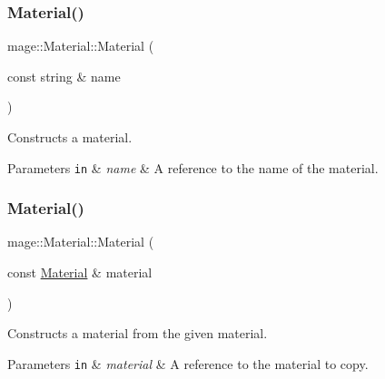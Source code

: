 \subsubsection{\texorpdfstring{Material()}{Material()}\hspace{0.1cm}{\footnotesize\ttfamily [1/3]}}
{\footnotesize\ttfamily mage\+::\+Material\+::\+Material (\begin{DoxyParamCaption}\item[{const string \&}]{name }\end{DoxyParamCaption})\hspace{0.3cm}{\ttfamily [explicit]}}

Constructs a material.


\begin{DoxyParams}[1]{Parameters}
\mbox{\tt in}  & {\em name} & A reference to the name of the material. \\
\hline
\end{DoxyParams}
\hypertarget{structmage_1_1_material_abed630412cdc4a6281389d128ec4b5f3}{}\label{structmage_1_1_material_abed630412cdc4a6281389d128ec4b5f3} 
\subsubsection{\texorpdfstring{Material()}{Material()}\hspace{0.1cm}{\footnotesize\ttfamily [2/3]}}
{\footnotesize\ttfamily mage\+::\+Material\+::\+Material (\begin{DoxyParamCaption}\item[{const \hyperlink{structmage_1_1_material}{Material} \&}]{material }\end{DoxyParamCaption})\hspace{0.3cm}{\ttfamily [default]}}

Constructs a material from the given material.


\begin{DoxyParams}[1]{Parameters}
\mbox{\tt in}  & {\em material} & A reference to the material to copy. \\
\hline
\end{DoxyParams}
\hypertarget{structmage_1_1_material_a41bfbc2bfa16e3694ac443d390b804c2}{}\label{structmage_1_1_material_a41bfbc2bfa16e3694ac443d390b804c2} 

